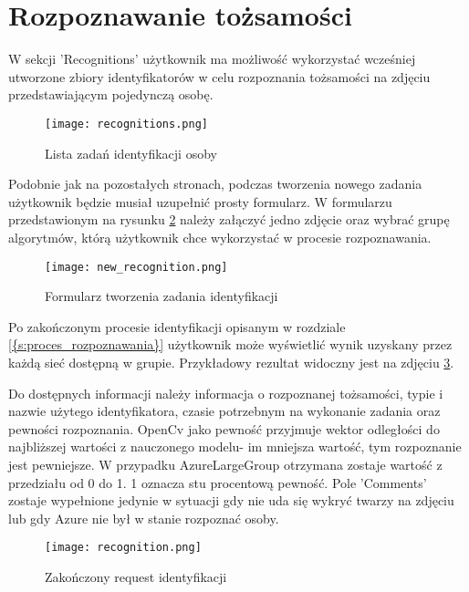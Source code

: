 \section{Rozpoznawanie tożsamości}
W sekcji 'Recognitions' użytkownik ma możliwość wykorzystać wcześniej utworzone zbiory identyfikatorów w celu rozpoznania tożsamości na zdjęciu przedstawiającym pojedynczą osobę.
\begin{figure}[H]
	\centering
	\texttt{[image: recognitions.png]}
	\caption{Lista zadań identyfikacji osoby}
	\label{fig:recognitions}
\end{figure}
Podobnie jak na pozostałych stronach, podczas tworzenia nowego zadania użytkownik będzie musiał uzupełnić prosty formularz. W formularzu przedstawionym na rysunku \ref{fig:new_recognition} należy załączyć jedno zdjęcie oraz wybrać grupę algorytmów, którą użytkownik chce wykorzystać w procesie rozpoznawania.
\begin{figure}[H]
	\centering
	\texttt{[image: new\_recognition.png]}
	\caption{Formularz tworzenia zadania identyfikacji}
	\label{fig:new_recognition}
\end{figure}
Po zakończonym procesie identyfikacji opisanym w rozdziale \ref{{s:proces_rozpoznawania}} użytkownik może wyświetlić wynik uzyskany przez każdą sieć dostępną w grupie. Przykładowy rezultat widoczny jest na zdjęciu \ref{fig:recognition}. 

Do dostępnych informacji należy informacja o rozpoznanej tożsamości, typie i nazwie użytego identyfikatora, czasie potrzebnym na wykonanie zadania oraz pewności rozpoznania. 
OpenCv jako pewność przyjmuje wektor odległości do najbliższej wartości z nauczonego modelu- im mniejsza wartość, tym rozpoznanie jest pewniejsze. W przypadku AzureLargeGroup otrzymana zostaje wartość z przedziału od 0 do 1. 1 oznacza stu procentową pewność. Pole 'Comments' zostaje wypełnione jedynie w sytuacji gdy nie uda się wykryć twarzy na zdjęciu lub gdy Azure nie był w stanie rozpoznać osoby.
\begin{figure}[H]
	\centering
	\texttt{[image: recognition.png]}
	\caption{Zakończony request identyfikacji}
	\label{fig:recognition}
\end{figure}

